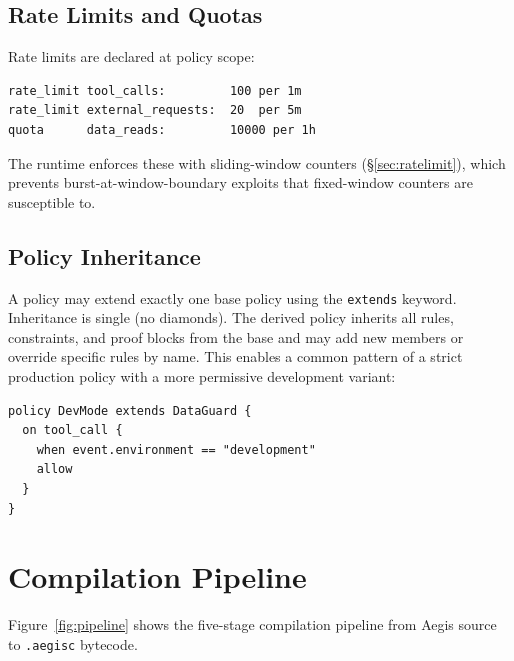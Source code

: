 \documentclass[sigconf]{acmart}
\begin{document}
\subsection{Rate Limits and Quotas}

Rate limits are declared at policy scope:

\begin{lstlisting}[numbers=none]
rate_limit tool_calls:         100 per 1m
rate_limit external_requests:  20  per 5m
quota      data_reads:         10000 per 1h
\end{lstlisting}

\noindent The runtime enforces these with sliding-window counters
(\S\ref{sec:ratelimit}), which prevents burst-at-window-boundary exploits that
fixed-window counters are susceptible to.

\subsection{Policy Inheritance}

A policy may extend exactly one base policy using the \texttt{extends} keyword.
Inheritance is single (no diamonds). The derived policy inherits all rules,
constraints, and proof blocks from the base and may add new members or override
specific rules by name. This enables a common pattern of a strict production
policy with a more permissive development variant:

\begin{lstlisting}[numbers=none]
policy DevMode extends DataGuard {
  on tool_call {
    when event.environment == "development"
    allow
  }
}
\end{lstlisting}


\section{Compilation Pipeline}
\label{sec:compiler}

Figure~\ref{fig:pipeline} shows the five-stage compilation pipeline from
Aegis source to \texttt{.aegisc} bytecode.
\end{document}
